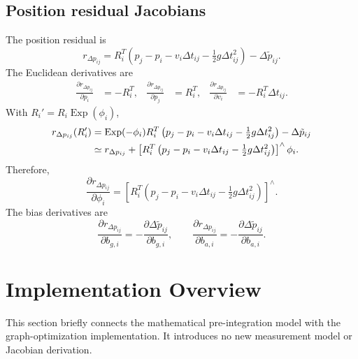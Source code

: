 \documentclass[11pt,a4paper]{article}
\newcommand{\Exp}{\operatorname{Exp}}
\begin{document}
\subsection{Position residual Jacobians}
The position residual is
\begin{equation}
r_{\Delta p_{ij}}=R_i^T\left(p_j-p_i-v_i\Delta t_{ij}-\tfrac12g\Delta t_{ij}^2\right)-\Delta\tilde p_{ij}.
\end{equation}
The Euclidean derivatives are
\begin{align}
\frac{\partial r_{\Delta p_{ij}}}{\partial p_i}&=-R_i^T,&
\frac{\partial r_{\Delta p_{ij}}}{\partial p_j}&=R_i^T,&
\frac{\partial r_{\Delta p_{ij}}}{\partial v_i}&=-R_i^T\Delta t_{ij}.
\end{align}
With $R_i'=R_i\Exp(\phi_i)$,
\begin{align}
r_{\Delta p_{ij}}(R_i')
&=\Exp(-\phi_i)R_i^T\left(p_j-p_i-v_i\Delta t_{ij}
-\tfrac12g\Delta t_{ij}^2\right)
-\Delta\tilde p_{ij}\notag\\
&\simeq r_{\Delta p_{ij}}+
\left[R_i^T\left(p_j-p_i-v_i\Delta t_{ij}
-\tfrac12g\Delta t_{ij}^2\right)\right]^\wedge\phi_i.
\end{align}
Therefore,
\begin{equation}\label{eq:JresPphi}
\boxed{\frac{\partial r_{\Delta p_{ij}}}{\partial\phi_i}
=\left[R_i^T\left(p_j-p_i-v_i\Delta t_{ij}
-\tfrac12g\Delta t_{ij}^2\right)\right]^\wedge.}
\end{equation}
The bias derivatives are
\begin{equation}
\frac{\partial r_{\Delta p_{ij}}}{\partial b_{g,i}}
=-\frac{\partial\Delta\tilde p_{ij}}{\partial b_{g,i}},\qquad
\frac{\partial r_{\Delta p_{ij}}}{\partial b_{a,i}}
=-\frac{\partial\Delta\tilde p_{ij}}{\partial b_{a,i}}.
\end{equation}

\section{Implementation Overview}
This section briefly connects the mathematical pre-integration model
with the graph-optimization implementation. It introduces no new
measurement model or Jacobian derivation.
\end{document}
